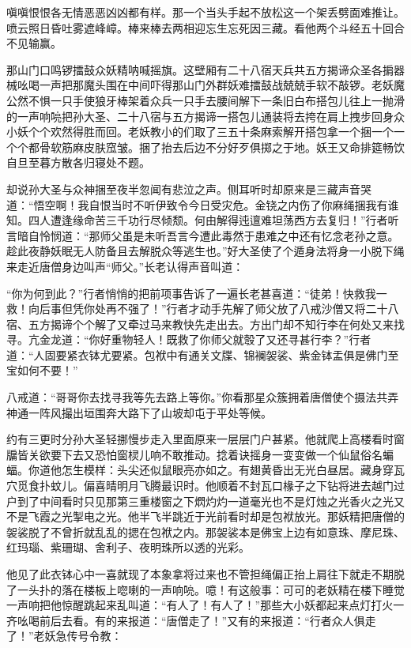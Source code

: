 \documentclass[12pt,UTF8]{ctexbook}
\begin{document}
嗔嗔恨恨各无情恶恶凶凶都有样。那一个当头手起不放松这一个架丢劈面难推让。喷云照日昏吐雾遮峰嶂。棒来棒去两相迎忘生忘死因三藏。看他两个斗经五十回合不见输赢。

那山门口鸣锣擂鼓众妖精呐喊摇旗。这壁厢有二十八宿天兵共五方揭谛众圣各掮器械吆喝一声把那魔头围在中间吓得那山门外群妖难擂鼓战兢兢手软不敲锣。老妖魔公然不惧一只手使狼牙棒架着众兵一只手去腰间解下一条旧白布搭包儿往上一抛滑的一声响喨把孙大圣、二十八宿与五方揭谛一搭包儿通装将去挎在肩上拽步回身众小妖个个欢然得胜而回。老妖教小的们取了三五十条麻索解开搭包拿一个捆一个一个个都骨软筋麻皮肤窊皱。捆了抬去后边不分好歹俱掷之于地。妖王又命排筵畅饮自旦至暮方散各归寝处不题。

却说孙大圣与众神捆至夜半忽闻有悲泣之声。侧耳听时却原来是三藏声音哭道：“悟空啊！我自恨当时不听伊致令今日受灾危。金铙之内伤了你麻绳捆我有谁知。四人遭逢缘命苦三千功行尽倾颓。何由解得迍邅难坦荡西方去复归！”行者听言暗自怜悯道：“那师父虽是未听吾言今遭此毒然于患难之中还有忆念老孙之意。趁此夜静妖眠无人防备且去解脱众等逃生也。”好大圣使了个遁身法将身一小脱下绳来走近唐僧身边叫声“师父。”长老认得声音叫道：

“你为何到此？”行者悄悄的把前项事告诉了一遍长老甚喜道：“徒弟！快救我一救！向后事但凭你处再不强了！”行者才动手先解了师父放了八戒沙僧又将二十八宿、五方揭谛个个解了又牵过马来教快先走出去。方出门却不知行李在何处又来找寻。亢金龙道：“你好重物轻人！既救了你师父就彀了又还寻甚行李？”行者道：“人固要紧衣钵尤要紧。包袱中有通关文牒、锦襕袈裟、紫金钵盂俱是佛门至宝如何不要！”

八戒道：“哥哥你去找寻我等先去路上等你。”你看那星众簇拥着唐僧使个摄法共弄神通一阵风撮出垣围奔大路下了山坡却屯于平处等候。

约有三更时分孙大圣轻挪慢步走入里面原来一层层门户甚紧。他就爬上高楼看时窗牖皆关欲要下去又恐怕窗棂儿响不敢推动。捻着诀摇身一变变做一个仙鼠俗名蝙蝠。你道他怎生模样：头尖还似鼠眼亮亦如之。有翅黄昏出无光白昼居。藏身穿瓦穴觅食扑蚊儿。偏喜晴明月飞腾最识时。他顺着不封瓦口椽子之下钻将进去越门过户到了中间看时只见那第三重楼窗之下熌灼灼一道毫光也不是灯烛之光香火之光又不是飞霞之光掣电之光。他半飞半跳近于光前看时却是包袱放光。那妖精把唐僧的袈裟脱了不曾折就乱乱的揌在包袱之内。那袈裟本是佛宝上边有如意珠、摩尼珠、红玛瑙、紫珊瑚、舍利子、夜明珠所以透的光彩。

他见了此衣钵心中一喜就现了本象拿将过来也不管担绳偏正抬上肩往下就走不期脱了一头扑的落在楼板上唿喇的一声响喨。噫！有这般事：可可的老妖精在楼下睡觉一声响把他惊醒跳起来乱叫道：“有人了！有人了！”那些大小妖都起来点灯打火一齐吆喝前后去看。有的来报道：“唐僧走了！”又有的来报道：“行者众人俱走了！”老妖急传号令教：
\end{document}
